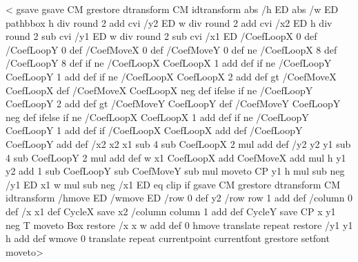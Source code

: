 <%
  gsave
    gsave \tx@STV CM grestore dtransform CM idtransform
    abs /h ED abs /w ED
    pathbbox
    h div round 2 add cvi /y2 ED
    w div round 2 add cvi /x2 ED
    h div round 2 sub cvi /y1 ED
    w div round 2 sub cvi /x1 ED
    /CoefLoopX 0 def
    /CoefLoopY 0 def
    /CoefMoveX 0 def
    /CoefMoveY 0 def
     ne {/CoefLoopX 8 def /CoefLoopY 8 def} if
     ne {/CoefLoopX CoefLoopX 1 add def} if
     ne {/CoefLoopY CoefLoopY 1 add def} if
     ne
      {/CoefLoopX CoefLoopX 2 add def
        gt {/CoefMoveX CoefLoopX def}
                           {/CoefMoveX CoefLoopX neg def} ifelse} if
     ne
      {/CoefLoopY CoefLoopY 2 add def
        gt {/CoefMoveY CoefLoopY def}
                           {/CoefMoveY CoefLoopY neg def} ifelse} if
     ne {/CoefLoopX CoefLoopX 1 add def} if
     ne {/CoefLoopY CoefLoopY 1 add def} if
    /CoefLoopX CoefLoopX \psk@fillloopaddx add def
    /CoefLoopY CoefLoopY \psk@fillloopaddy add def
%
    /x2 x2 x1 sub 4 sub CoefLoopX 2 mul add def
    /y2 y2 y1 sub 4 sub CoefLoopY 2 mul add def
    w x1 CoefLoopX add CoefMoveX add mul
      h y1 y2 add 1 sub CoefLoopY sub CoefMoveY sub mul moveto
%
    CP
    y1 h mul sub neg /y1 ED
    x1 w mul sub neg /x1 ED
     eq {clip} if
    \psk@fillmovex \psk@fillmovey
    gsave \tx@STV CM grestore dtransform CM idtransform
    /hmove ED /wmove ED
%
    /row 0 def
   y2 {
       /row row 1 add def
       /column 0 def
       /x x1 def
       CycleX
       save
       x2 {
          /column column 1 add def
          CycleY
          save CP x y1 
          \ifx\VTeXversion\undefined
          \else
          neg
          \fi
	  T moveto Box restore
          /x x w add def
          0 hmove translate
          } repeat
       restore
       /y1 y1 h add def
       wmove 0 translate
       } repeat
  currentpoint currentfont grestore setfont moveto>
\fi

